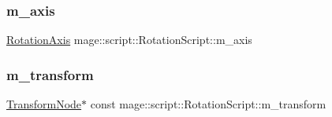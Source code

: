 \subsubsection{\texorpdfstring{m\+\_\+axis}{m\_axis}}
{\footnotesize\ttfamily \hyperlink{classmage_1_1script_1_1_rotation_script_aa8a91cc8c771fc777ffb5e8a28c43ad2}{Rotation\+Axis} mage\+::script\+::\+Rotation\+Script\+::m\+\_\+axis\hspace{0.3cm}{\ttfamily [private]}}

\hypertarget{classmage_1_1script_1_1_rotation_script_a6dd0624548f5cd64db3974351337a338}{}\label{classmage_1_1script_1_1_rotation_script_a6dd0624548f5cd64db3974351337a338} 
\subsubsection{\texorpdfstring{m\+\_\+transform}{m\_transform}}
{\footnotesize\ttfamily \hyperlink{classmage_1_1_transform_node}{Transform\+Node}$\ast$ const mage\+::script\+::\+Rotation\+Script\+::m\+\_\+transform\hspace{0.3cm}{\ttfamily [private]}}

